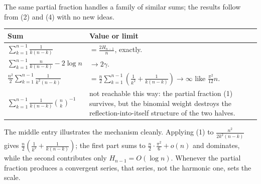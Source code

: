 \documentclass[12pt]{article}
\newcommand{\Hh}{H}
\begin{document}
The same partial fraction handles a family of similar sums; the results
follow from (2) and (4) with no new ideas.

\begin{center}
\small
\renewcommand{\arraystretch}{1.5}
\begin{tabularx}{\textwidth}{@{}>{\raggedright\arraybackslash}p{}X@{}}
\toprule
Sum & Value or limit \\
\midrule
\(\displaystyle\sum_{k=1}^{n-1}\frac{1}{k(n-k)}\)
& \(\displaystyle=\frac{2\Hh_{n-1}}{n}\), exactly. \\
\addlinespace
\(\displaystyle\sum_{k=1}^{n-1}\frac{n}{k(n-k)}-2\log n\)
& \(\to 2\gamma\). \\
\addlinespace
\(\displaystyle\frac{n^2}{2}\sum_{k=1}^{n-1}\frac1{k^2(n-k)}\)
& \(\displaystyle=\frac n2\sum_{k=1}^{n-1}\left(\frac1{k^2}+\frac{1}{k(n-k)}\right)
\to\infty\) like \(\frac{\pi^2}{12}n\). \\
\addlinespace
\(\displaystyle\sum_{k=1}^{n-1}\frac1{k(n-k)}\binom{n}{k}^{-1}\)
& not reachable this way: the partial fraction (1) survives, but the
binomial weight destroys the reflection-into-itself structure of the two
halves. \\
\bottomrule
\end{tabularx}
\end{center}

The middle entry illustrates the mechanism cleanly. Applying (1) to
\(\frac{n^2}{2k^2(n-k)}\) gives \(\frac n2\left(\frac1{k^2}+\frac1{k(n-k)}\right)\);
the first part sums to \(\frac n2\cdot\frac{\pi^2}{6}+o(n)\) and dominates,
while the second contributes only \(\Hh_{n-1}=O(\log n)\). Whenever the
partial fraction produces a convergent series, that series, not the
harmonic one, sets the scale.
\end{document}
